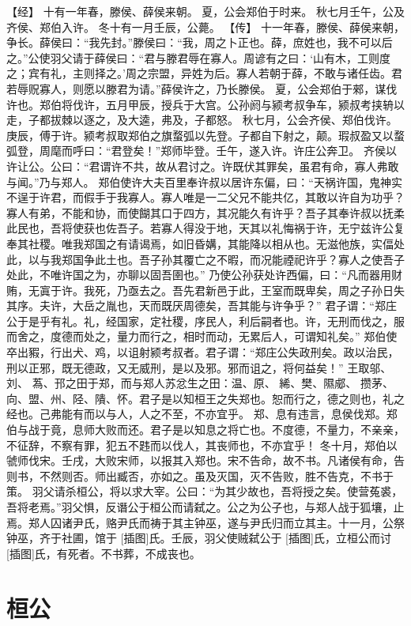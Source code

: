 \documentclass[a4paper,12pt,UTF8,twoside]{ctexbook}
\begin{document}
【经】
十有一年春，滕侯、薛侯来朝。
夏，公会郑伯于时来。
秋七月壬午，公及齐侯、郑伯入许。
冬十有一月壬辰，公薨。
【传】
十一年春，滕侯、薛侯来朝，争长。薛侯曰：“我先封。”滕侯曰：“我，周之卜正也。薛，庶姓也，我不可以后之。”公使羽父请于薛侯曰：“君与滕君辱在寡人。周谚有之曰：‘山有木，工则度之；宾有礼，主则择之。’周之宗盟，异姓为后。寡人若朝于薛，不敢与诸任齿。君若辱贶寡人，则愿以滕君为请。”薛侯许之，乃长滕侯。
夏，公会郑伯于郲，谋伐许也。郑伯将伐许，五月甲辰，授兵于大宫。公孙阏与颍考叔争车，颍叔考挟辀以走，子都拔棘以逐之，及大逵，弗及，子都怒。
秋七月，公会齐侯、郑伯伐许。庚辰，傅于许。颍考叔取郑伯之旗蝥弧以先登。子都自下射之，颠。瑕叔盈又以蝥弧登，周麾而呼曰：“君登矣！”郑师毕登。壬午，遂入许。许庄公奔卫。
齐侯以许让公。公曰：“君谓许不共，故从君讨之。许既伏其罪矣，虽君有命，寡人弗敢与闻。”乃与郑人。
郑伯使许大夫百里奉许叔以居许东偏，曰：“天祸许国，鬼神实不逞于许君，而假手于我寡人。寡人唯是一二父兄不能共亿，其敢以许自为功乎？寡人有弟，不能和协，而使餬其口于四方，其况能久有许乎？吾子其奉许叔以抚柔此民也，吾将使获也佐吾子。若寡人得没于地，天其以礼悔祸于许，无宁兹许公复奉其社稷。唯我郑国之有请谒焉，如旧昏媾，其能降以相从也。无滋他族，实偪处此，以与我郑国争此土也。吾子孙其覆亡之不暇，而况能禋祀许乎？寡人之使吾子处此，不唯许国之为，亦聊以固吾圉也。”
乃使公孙获处许西偏，曰：“凡而器用财贿，无寘于许。我死，乃亟去之。吾先君新邑于此，王室而既卑矣，周之子孙日失其序。夫许，大岳之胤也，天而既厌周德矣，吾其能与许争乎？”
君子谓：“郑庄公于是乎有礼。礼，经国家，定社稷，序民人，利后嗣者也。许，无刑而伐之，服而舍之，度德而处之，量力而行之，相时而动，无累后人，可谓知礼矣。”
郑伯使卒出豭，行出犬、鸡，以诅射颍考叔者。君子谓：“郑庄公失政刑矣。政以治民，刑以正邪，既无德政，又无威刑，是以及邪。邪而诅之，将何益矣！”
王取邬、刘、 蒍、邘之田于郑，而与郑人苏忿生之田：温、原、 絺、樊、隰郕、 攒茅、向、盟、州、陉、隤、怀。君子是以知桓王之失郑也。恕而行之，德之则也，礼之经也。己弗能有而以与人，人之不至，不亦宜乎。
郑、息有违言，息侯伐郑。郑伯与战于竟，息师大败而还。君子是以知息之将亡也。不度德，不量力，不亲亲，不征辞，不察有罪，犯五不韪而以伐人，其丧师也，不亦宜乎！
冬十月，郑伯以虢师伐宋。壬戌，大败宋师，以报其入郑也。宋不告命，故不书。凡诸侯有命，告则书，不然则否。师出臧否，亦如之。虽及灭国，灭不告败，胜不告克，不书于策。
羽父请杀桓公，将以求大宰。公曰：“为其少故也，吾将授之矣。使营菟裘，吾将老焉。”羽父惧，反谮公于桓公而请弑之。公之为公子也，与郑人战于狐壤，止焉。郑人囚诸尹氏，赂尹氏而祷于其主钟巫，遂与尹氏归而立其主。十一月，公祭钟巫，齐于社圃，馆于 [插图]氏。壬辰，羽父使贼弑公于 [插图]氏，立桓公而讨 [插图]氏，有死者。不书葬，不成丧也。

\chapter{桓公}
\end{document}
